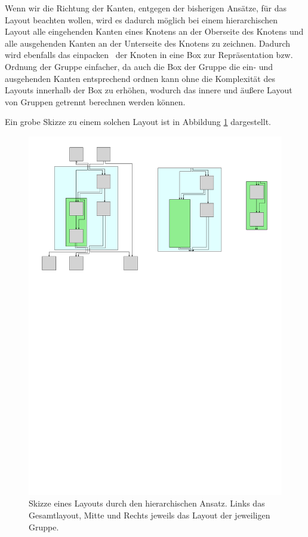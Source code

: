 Wenn wir die Richtung der Kanten, entgegen der bisherigen Ansätze, für das Layout beachten wollen, wird es dadurch möglich bei einem hierarchischen Layout alle eingehenden Kanten eines Knotens an der Oberseite des Knotens und alle ausgehenden Kanten an der Unterseite des Knotens zu zeichnen. Dadurch wird ebenfalls das \glqq einpacken \grqq\ der Knoten in eine Box zur Repräsentation bzw. Ordnung der Gruppe einfacher, da auch die Box der Gruppe die ein- und ausgehenden Kanten entsprechend ordnen kann ohne die Komplexität des Layouts innerhalb der Box zu erhöhen, wodurch das innere und äußere Layout von Gruppen getrennt berechnen werden können.

Ein grobe Skizze zu einem solchen Layout ist in Abbildung \ref{Hierarch-Skizze} dargestellt.

\begin{figure}[h!]
\begin{center}
	\includegraphics[width=\textwidth]{Pics/hierarchisch.pdf}
	\caption{Skizze eines Layouts durch den hierarchischen Ansatz. Links das Gesamtlayout, Mitte und Rechts jeweils das Layout der jeweiligen Gruppe.}
	\label{Hierarch-Skizze}
\end{center}
\end{figure}


